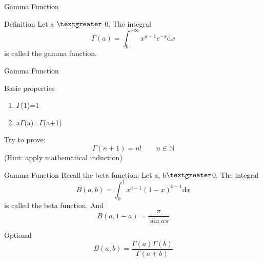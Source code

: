 \documentclass[
	11pt, %
]{beamer}
\begin{document}
\begin{frame}{Gamma Function}
\begin{block}{Definition}
Let a $\textgreater$ 0. The integral
\begin{equation*}
    \Gamma (a)=\int_0^{+\infty}x^{a-1}e^{-x}\mathrm{d}x
\end{equation*}
is called the gamma function.
\end{block}

\end{frame}

\begin{frame}{Gamma Function}
\begin{block}{Basic properties}
\begin{enumerate}
    \item $\Gamma$(1)=1
    \item a$\Gamma$(a)=$\Gamma$(a+1)
\end{enumerate}
\end{block}
    Try to prove:
    \begin{equation*}
        \Gamma(n+1)=n!\qquad n\in \mathbb{N}
    \end{equation*}
    (Hint: apply mathematical induction)
    
\end{frame}


\begin{frame}{Gamma Function}
    Recall the beta function: Let a, b$\textgreater$0. The integral
    \begin{equation*}
        B(a,b)=\int_0^1 x^{a-1}(1-x)^{b-1}\mathrm{d}x
    \end{equation*}
    is called the beta function. And
    \begin{equation*}
        B(a, 1-a)=\frac{\pi}{\sin a\pi}
    \end{equation*}
\begin{block}{Optional}
    \begin{equation*}
        B(a, b)=\frac{\Gamma(a)\Gamma(b)}{\Gamma(a+b)}
    \end{equation*}
\end{block}

\end{frame}
\end{document}
